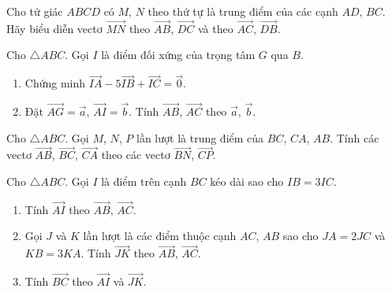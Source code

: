 \begin{bt}%
	Cho tứ giác $ABCD$ có $M$, $N$ theo thứ tự là trung điểm của các cạnh $AD$, $BC$. Hãy biểu diễn vectơ $\overrightarrow{MN}$ theo $\overrightarrow{AB}$, $\overrightarrow{DC}$ và theo $\overrightarrow{AC}$, $\overrightarrow{DB}$.
\end{bt}

\begin{bt}%
	Cho $\triangle ABC$. Gọi $I$ là điểm đối xứng của trọng tâm $G$ qua $B$.
	\begin{enumerate}
		\item Chứng minh $\overrightarrow{IA}-5\overrightarrow{IB}+\overrightarrow{IC}=\overrightarrow{0}$.
		\item Đặt $\overrightarrow{AG}=\overrightarrow{a}$, $\overrightarrow{AI}=\overrightarrow{b}$. Tính $\overrightarrow{AB}$, $\overrightarrow{AC}$ theo $\overrightarrow{a}$, $\overrightarrow{b}$.
	\end{enumerate}
\end{bt}

\begin{bt}%
	Cho $\triangle ABC$. Gọi $M$, $N$, $P$ lần lượt là trung điểm của $BC$, $CA$, $AB$. Tính các vectơ $\overrightarrow{AB}$, $\overrightarrow{BC}$, $\overrightarrow{CA}$ theo các vectơ $\overrightarrow{BN}$, $\overrightarrow{CP}$.
\end{bt}

\begin{bt}%
	Cho $\triangle ABC$. Gọi $I$ là điểm trên cạnh $BC$ kéo dài sao cho $IB=3IC$.
	\begin{enumerate}
		\item Tính $\overrightarrow{AI}$ theo $\overrightarrow{AB}$, $\overrightarrow{AC}$.
		\item Gọi $J$ và $K$ lần lượt là các điểm thuộc cạnh $AC$, $AB$ sao cho $JA=2JC$ và $KB=3KA$. Tính $\overrightarrow{JK}$ theo $\overrightarrow{AB}$, $\overrightarrow{AC}$.
		\item Tính $\overrightarrow{BC}$ theo $\overrightarrow{AI}$ và $\overrightarrow{JK}$.
	\end{enumerate}
\end{bt}
